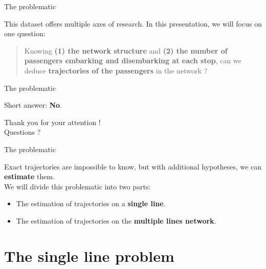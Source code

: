 \documentclass[10pt]{beamer}
\newcommand{\imp}[1]{\textbf{\color{cyan}#1}}
\begin{document}

	\begin{frame}{The problematic}
		
		This dataset offers multiple axes of research. In this presentation, we will focus on one question: \vspace{0.4cm}
		
		\begin{quotation}
			\large
			Knowing \imp{(1) the network structure} and \imp{(2) the number of passengers embarking and disembarking at each stop}, can we deduce \imp{trajectories of the passengers} in the network ?
		\end{quotation}
		
	\end{frame}

	
	\begin{frame}{The problematic}
		
		Short answer: {\large \imp{No}}.
		
		\begin{center}
			\huge Thank you for your attention ! \\
			Questions ?
		\end{center}
		
	\end{frame}
	
	
	\begin{frame}{The problematic}
		
		Exact trajectories are impossible to know, but with additional hypotheses, we can \imp{estimate} them. \\
		\vspace{0.4cm}
		We will divide this problematic into two parts:
		\begin{itemize}
			\item The estimation of trajectories on a \imp{single line}.
			\item The estimation of trajectories on the \imp{multiple lines network}.
		\end{itemize}
		
	\end{frame}
	
	
	\section{The single line problem}
	
\end{document}
